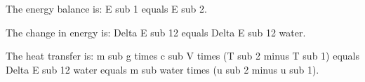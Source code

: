 The energy balance is:  
E sub 1 equals E sub 2.  

The change in energy is:  
Delta E sub 12 equals Delta E sub 12 water.  

The heat transfer is:  
m sub g times c sub V times (T sub 2 minus T sub 1) equals Delta E sub 12 water equals m sub water times (u sub 2 minus u sub 1).